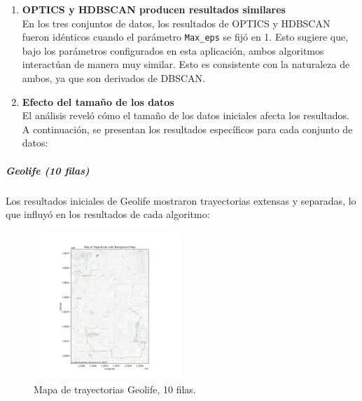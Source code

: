 \begin{enumerate}
    \item \textbf{OPTICS y HDBSCAN producen resultados similares}  \\
    En los tres conjuntos de datos, los resultados de OPTICS y HDBSCAN fueron idénticos cuando el parámetro \texttt{Max\_eps} se fijó en 1. Esto sugiere que, bajo los parámetros configurados en esta aplicación, ambos algoritmos interactúan de manera muy similar. Esto es consistente con la naturaleza de ambos, ya que son derivados de DBSCAN.

    \item \textbf{Efecto del tamaño de los datos}  \\
    El análisis reveló cómo el tamaño de los datos iniciales afecta los resultados. A continuación, se presentan los resultados específicos para cada conjunto de datos:
\end{enumerate}

\subparagraph{Geolife (10 filas)}

Los resultados iniciales de Geolife mostraron trayectorias extensas y separadas, lo que influyó en los resultados de cada algoritmo:

\begin{figure}[h!]
    \centering
    \includegraphics[width=0.5\textwidth]{img/Geolife/map_prueba_10datos.png}
    \caption{Mapa de trayectorias Geolife, 10 filas.}
    \label{fig:geolife_10}
\end{figure}

